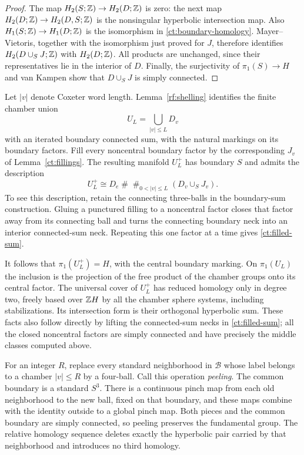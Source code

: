 \begin{proof}
The map $H_2(S;\mathbb Z)\to H_2(D;\mathbb Z)$ is zero: the next map
$H_2(D;\mathbb Z)\to H_2(D,S;\mathbb Z)$ is the nonsingular hyperbolic intersection
map.  Also $H_1(S;\mathbb Z)\to H_1(D;\mathbb Z)$ is the isomorphism in
\eqref{ct:boundary-homology}.  Mayer--Vietoris, together with the
isomorphism just proved for $J$, therefore identifies
$H_2(D\cup_S J;\mathbb Z)$ with $H_2(D;\mathbb Z)$.  All products are unchanged,
since their representatives lie in the interior of $D$.
Finally, the surjectivity of $\pi_1(S)\to H$ and van Kampen show that
$D\cup_S J$ is simply connected.
\end{proof}

Let $|v|$ denote Coxeter word length.  Lemma~\ref{rf:shelling} identifies
the finite chamber union
\[
                  U_L=\bigcup_{|v|\leq L}D_v
\]
with an iterated boundary connected sum, with the natural markings on
its boundary factors.  Fill every noncentral boundary factor by the
corresponding $J_v$ of Lemma~\ref{ct:fillings}.  The resulting manifold
$U_L^+$ has boundary $S$ and admits the description
\begin{equation}\label{ct:filled-sum}
 U_L^+\cong D_e\mathbin{\#}
       \mathop{\#}_{0<|v|\leq L}(D_v\cup_S J_v).
\end{equation}
To see this description, retain the connecting three-balls in the
boundary-sum construction.  Gluing a punctured filling to a noncentral
factor closes that factor away from its connecting ball and turns the
connecting boundary neck into an interior connected-sum neck.  Repeating
this one factor at a time gives \eqref{ct:filled-sum}.

It follows that $\pi_1(U_L^+)=H$, with the central boundary marking.
On $\pi_1(U_L)$ the inclusion is the projection of the free product of
the chamber groups onto its central factor.  The universal cover of
$U_L^+$ has reduced homology only in degree two, freely based over
$\mathbb Z H$ by all the chamber sphere systems, including stabilizations.
Its intersection form is their orthogonal hyperbolic sum.  These facts
also follow directly by lifting the connected-sum necks in
\eqref{ct:filled-sum}; all the closed noncentral factors are simply
connected and have precisely the middle classes computed above.

For an integer $R$, replace every standard neighborhood in $\mathcal B$
whose label belongs to a chamber $|v|\leq R$ by a four-ball.  Call this
operation \emph{peeling}.  The common boundary is a standard $S^3$.
There is a continuous pinch map from each old neighborhood to the new
ball, fixed on that boundary, and these maps combine with the identity
outside to a global pinch map.  Both pieces and the common boundary are
simply connected, so peeling preserves the fundamental group.  The
relative homology sequence deletes exactly the hyperbolic pair carried
by that neighborhood and introduces no third homology.


